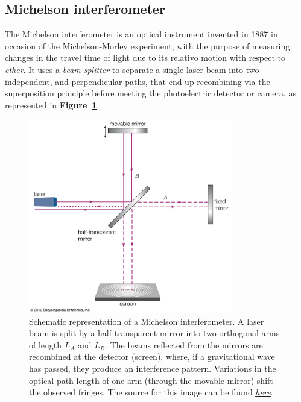 \subsection{Michelson interferometer}
The Michelson interferometer is an optical instrument invented in 1887 in occasion of the Michelson-Morley experiment, with the purpose of measuring changes in the travel time of light due to its relativo motion with respect to \textit{ether}.
It uses a \textit{beam splitter} to separate a single laser beam into two independent, and perpendicular paths, that end up recombining via the superposition principle before meeting the photoelectric detector or camera, as represented in \textbf{Figure~\ref{fig: michaelson interferometer}}.
\begin{figure}
    \begin{center}
        \includegraphics[width=0.8\textwidth]{images/michaelson_interferometer.jpg}
    \end{center}
    \caption{Schematic representation of a Michelson interferometer. A laser beam is split by a half-transparent mirror into two orthogonal arms of length $L_A$ and $L_B$.
    The beams reflected from the mirrors are recombined at the detector (screen), where, if a gravitational wave has passed, they produce an interference pattern.
    Variations in the optical path length of one arm (through the movable mirror) shift the observed fringes.
The source for this image can be found \underline{\textit{\href{https://www.britannica.com/technology/Michelson-interferometer}{here}}}.}
    \label{fig: michaelson interferometer}
\end{figure}
